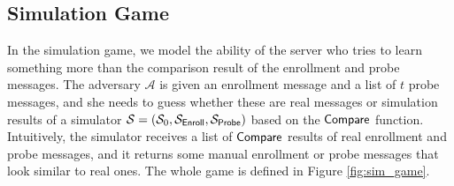 \subsection{Simulation Game}
\label{sec:simulation_game}

In the simulation game, we model the ability of the server who tries to learn something more than the comparison result of the enrollment and probe messages. The adversary $\mathcal{A}$ is given an enrollment message and a list of $t$ probe messages, and she needs to guess whether these are real messages or simulation results of a simulator $\mathcal{S} = (\mathcal{S}_0, \mathcal{S}_{\sf Enroll}, \mathcal{S}_{\sf Probe})$ based on the $\sf Compare$ function. Intuitively, the simulator receives a list of $\sf Compare$ results of real enrollment and probe messages, and it returns some manual enrollment or probe messages that look similar to real ones. The whole game is defined in Figure \ref{fig:sim_game}.

